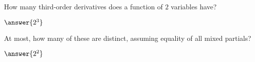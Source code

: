 \documentclass{ximera}
\author{David Guichard \and Neal Koblitz \and H. Jerome Keisler \and Albert Scheller \and Barry Balof \and Mike Wills \and Matthew Carr}
\begin{document}
\begin{exercise}




How many third-order derivatives does a function of $2$ variables have? \begin{prompt}$\answer{2^3}$\end{prompt}

At most, how many of these are distinct, assuming equality of all mixed partials? \begin{prompt}$\answer{2^2}$\end{prompt}



\end{exercise}
\end{document}
